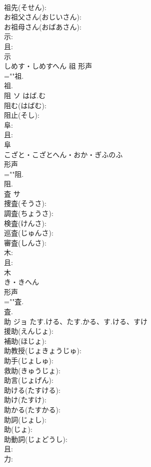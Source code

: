 \documentclass[8pt]{extreport}
\begin{document}
\begin{CJK}{UTF8}{min}
\\	祖先(そせん): 
\\	お祖父さん(おじいさん): 
\\	お祖母さん(おばあさん): 
\\	示: 
\\	且: 
\\	示	
\\	しめす・しめすへん	祖	形声 
\\	=""祖.
\\	祖.
\\	阻	ソ	はば.む		
\\	阻む(はばむ): 
\\	阻止(そし): 
\\	阜: 
\\	且: 
\\	阜	
\\	こざと・こざとへん・おか・ぎふのふ	
\\	形声 
\\	=""阻.
\\	阻.
\\	査	サ			
\\	捜査(そうさ): 
\\	調査(ちょうさ): 
\\	検査(けんさ): 
\\	巡査(じゅんさ): 
\\	審査(しんさ): 
\\	木: 
\\	且: 
\\	木	
\\	き・きへん	
\\	形声 
\\	=""査.
\\	査.
\\	助	ジョ	たす.ける、たす.かる、す.ける、すけ		
\\	援助(えんじょ): 
\\	補助(ほじょ): 
\\	助教授(じょきょうじゅ): 
\\	助手(じょしゅ): 
\\	救助(きゅうじょ): 
\\	助言(じょげん): 
\\	助ける(たすける): 
\\	助け(たすけ): 
\\	助かる(たすかる): 
\\	助詞(じょし): 
\\	助(じょ): 
\\	助動詞(じょどうし): 
\\	且: 
\\	力: 

\end{CJK}
\end{document}
